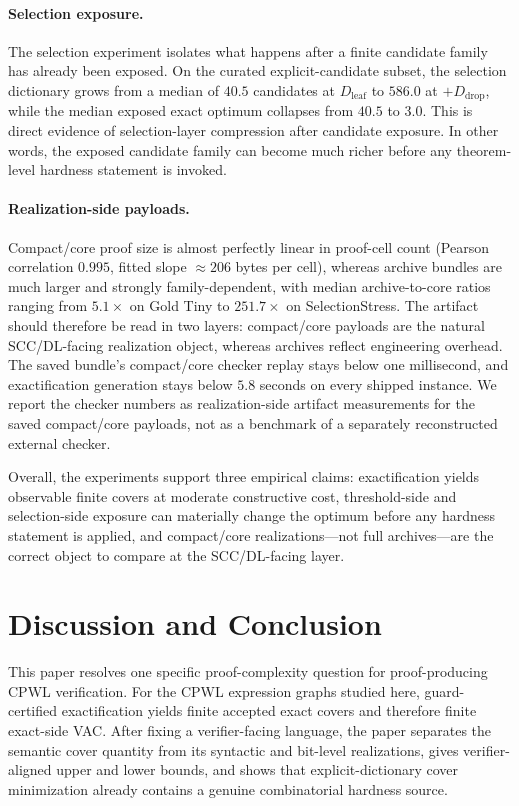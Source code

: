 \documentclass{article}
\begin{document}
\paragraph{Selection exposure.}
The selection experiment isolates what happens after a finite candidate family has already been exposed. On the curated explicit-candidate subset, the selection dictionary grows from a median of $40.5$ candidates at $D_{\mathrm{leaf}}$ to $586.0$ at $+D_{\mathrm{drop}}$, while the median exposed exact optimum collapses from $40.5$ to $3.0$. This is direct evidence of selection-layer compression after candidate exposure. In other words, the exposed candidate family can become much richer before any theorem-level hardness statement is invoked.

\paragraph{Realization-side payloads.}
Compact/core proof size is almost perfectly linear in proof-cell count (Pearson correlation $0.995$, fitted slope $\approx 206$ bytes per cell), whereas archive bundles are much larger and strongly family-dependent, with median archive-to-core ratios ranging from $5.1\times$ on Gold Tiny to $251.7\times$ on SelectionStress. The artifact should therefore be read in two layers: compact/core payloads are the natural SCC/DL-facing realization object, whereas archives reflect engineering overhead. The saved bundle's compact/core checker replay stays below one millisecond, and exactification generation stays below $5.8$ seconds on every shipped instance. We report the checker numbers as realization-side artifact measurements for the saved compact/core payloads, not as a benchmark of a separately reconstructed external checker.

Overall, the experiments support three empirical claims: exactification yields observable finite covers at moderate constructive cost, threshold-side and selection-side exposure can materially change the optimum before any hardness statement is applied, and compact/core realizations---not full archives---are the correct object to compare at the SCC/DL-facing layer.

\section{Discussion and Conclusion}

This paper resolves one specific proof-complexity question for proof-producing CPWL verification. For the CPWL expression graphs studied here, guard-certified exactification yields finite accepted exact covers and therefore finite exact-side VAC. After fixing a verifier-facing language, the paper separates the semantic cover quantity from its syntactic and bit-level realizations, gives verifier-aligned upper and lower bounds, and shows that explicit-dictionary cover minimization already contains a genuine combinatorial hardness source.
\end{document}
